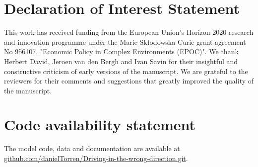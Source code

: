\documentclass[12pt]{article}
\begin{document}
	\section*{Declaration of Interest Statement}
	This work has received funding from the European Union’s Horizon 2020 research and innovation programme under the Marie Skłodowska-Curie grant agreement No 956107, "Economic Policy in Complex Environments (EPOC)". We thank Herbert David, Jeroen van den Bergh and Ivan Savin for their insightful and constructive criticism of early versions of the manuscript. We are grateful to the reviewers for their comments and suggestions that greatly improved the quality of the manuscript.

	\section*{Code availability statement}
	The model code, data and documentation are available at \href{https://github.com/danielTorren/Driving-in-the-wrong-direction.git}{github.com/danielTorren/Driving-in-the-wrong-direction.git}.
\end{document}
